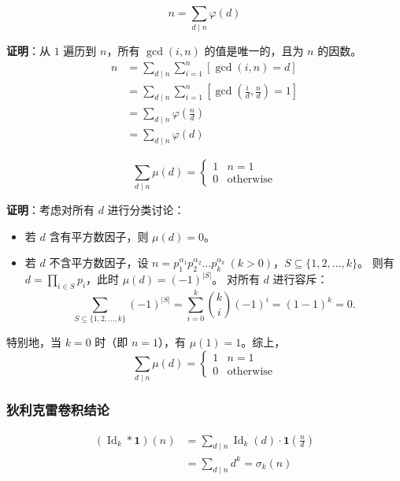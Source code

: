 \[
n = \sum_{d \mid n} \varphi(d)
\]

\textbf{证明}：从 $1$ 遍历到 $n$，所有 $\gcd(i, n)$ 的值是唯一的，且为 $n$ 的因数。
\[
\begin{aligned}
n &= \sum_{d \mid n}\sum_{i=1}^{n} [\gcd(i, n) = d] \\
  &= \sum_{d \mid n}\sum_{i=1}^{n} \left[\gcd\!\left(\frac{i}{d}, \frac{n}{d}\right) = 1\right] \\
  &= \sum_{d \mid n} \varphi\!\left(\frac{n}{d}\right) \\
  &= \sum_{d \mid n} \varphi(d)
\end{aligned}
\]

\[
\sum_{d \mid n} \mu(d) = 
\begin{cases}
1 & n = 1 \\
0 & \text{otherwise}
\end{cases}
\]

\textbf{证明}：考虑对所有 $d$ 进行分类讨论：
\begin{itemize}
    \item 若 $d$ 含有平方数因子，则 $\mu(d) = 0$。
    \item 若 $d$ 不含平方数因子，设 $n = p_1^{\alpha_1}p_2^{\alpha_2}\dots p_k^{\alpha_k}\ (k>0)$，$S \subseteq \{1,2,\dots,k\}$。
          则有 $d = \prod_{i\in S} p_i$，此时 $\mu(d) = (-1)^{|S|}$。
          对所有 $d$ 进行容斥：
    \[
    \sum_{S \subseteq \{1,2,\dots,k\}} (-1)^{|S|}
    = \sum_{i=0}^{k} \binom{k}{i} (-1)^i
    = (1-1)^k = 0.
    \]
\end{itemize}
特别地，当 $k=0$ 时（即 $n=1$），有 $\mu(1)=1$。综上，
\[
\sum_{d\mid n} \mu(d) = 
\begin{cases}
1 & n=1 \\ 0 & \text{otherwise}
\end{cases}
\]

\subsubsection{狄利克雷卷积结论}

\[
\begin{aligned}
(\operatorname{Id}_k * \mathbf{1})(n) 
&= \sum_{d\mid n} \operatorname{Id}_k(d) \cdot \mathbf{1}\!\left(\frac{n}{d}\right) \\
&= \sum_{d\mid n} d^k = \sigma_k(n)
\end{aligned}
\]

